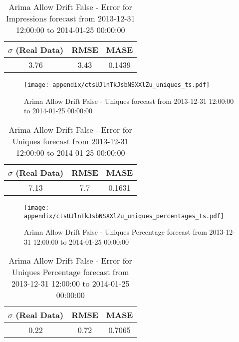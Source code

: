 \begin{table}[H]
\centering
\footnotesize
\begin{tabular}{ccc}
$\sigma$ (Real Data) & RMSE & MASE   \\ \hline
3.76 & 3.43 & 0.1439 \\
\end{tabular}

\vspace{0.5cm}

\caption[]{
Arima Allow Drift False - Error for Impressions forecast from 2013-12-31 12:00:00 to 2014-01-25 00:00:00}
\end{table}

\begin{figure}[H] \begin{center} \leavevmode
\texttt{[image: appendix/ctsUJlnTkJsbNSXXlZu\_uniques\_ts.pdf]} \caption[]{
Arima Allow Drift False - Uniques forecast from 2013-12-31 12:00:00 to 2014-01-25 00:00:00} \label{fig:appendix/ctsUJlnTkJsbNSXXlZu_uniques_ts.pdf} \end{center}
\end{figure}

\begin{table}[H]
\centering
\footnotesize
\begin{tabular}{ccc}
$\sigma$ (Real Data) & RMSE & MASE   \\ \hline
7.13 & 7.7 & 0.1631 \\
\end{tabular}

\vspace{0.5cm}

\caption[]{
Arima Allow Drift False - Error for Uniques forecast from 2013-12-31 12:00:00 to 2014-01-25 00:00:00}
\end{table}

\begin{figure}[H] \begin{center} \leavevmode
\texttt{[image: appendix/ctsUJlnTkJsbNSXXlZu\_uniques\_percentages\_ts.pdf]} \caption[]{
Arima Allow Drift False - Uniques Percentage forecast from 2013-12-31 12:00:00 to 2014-01-25 00:00:00} \label{fig:appendix/ctsUJlnTkJsbNSXXlZu_uniques_percentages_ts.pdf} \end{center}
\end{figure}

\begin{table}[H]
\centering
\footnotesize
\begin{tabular}{ccc}
$\sigma$ (Real Data) & RMSE & MASE   \\ \hline
0.22 & 0.72 & 0.7065 \\
\end{tabular}

\vspace{0.5cm}

\caption[]{
Arima Allow Drift False - Error for Uniques Percentage forecast from 2013-12-31 12:00:00 to 2014-01-25 00:00:00}
\end{table}


